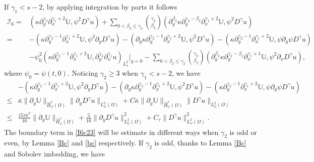 \documentclass{amsart}
\numberwithin{equation}{section}
\begin{document}
If $\gamma_{1}<s-2$, by applying integration by parts it follows
\begin{align}\label{I6c23}
\mathcal{I}_{6}
=&(\kappa\partial_{y}^{\gamma_{2}}\partial_{x}^{\gamma_{1}+2}\mathbb{U}, \psi^{2}D^{\gamma}u)
  +\sum_{0<\beta_{2}\leq\gamma_{2}}\binom{\gamma_{2}}{\beta_{2}}
   (\partial_{y}^{\beta_{2}}\kappa\partial_{y}^{\gamma_{2}-\beta_{2}}\partial_{x}^{\gamma_{1}+2}\mathbb{U},\psi^{2}D^{\gamma}u)\\
=&-(\kappa\partial_{y}^{\gamma_{2}-1}\partial_{x}^{\gamma_{1}+2}\mathbb{U}, \psi^{2} \partial_{y}D^{\gamma}u)
  -(\partial_{y}\kappa\partial_{y}^{\gamma_{2}-1}\partial_{x}^{\gamma_{1}+2}\mathbb{U}, \psi^{2}D^{\gamma}u)
  -(\kappa\partial_{y}^{\gamma_{2}-1}\partial_{x}^{\gamma_{1}+2}\mathbb{U}, \psi\partial_{y}\psi D^{\gamma}u)\nonumber\\
 &-\psi_{0}^{2}(\kappa\partial_{y}^{\gamma_{2}-1}\partial_{x}^{\gamma_{1}+2}\mathbb{U},\partial_{y}^{\gamma_{2}}\partial_{x}^{\gamma_{1}}u)_{L_{x}^{2}}|_{y=0}
  -\sum_{0<\beta_{2}\leq\gamma_{2}}\binom{\gamma_{2}}{\beta_{2}}
   (\partial_{y}^{\beta_{2}}\kappa\partial_{y}^{\gamma_{2}-\beta_{2}}\partial_{x}^{\gamma_{1}+1}\mathbb{U},\psi^{2}\partial_{x}D^{\gamma}u),\nonumber
\end{align}
where $\psi_{0}=\psi(t,0)$. Noticing $\gamma_{2}\geq3$ when $\gamma_{1}<s-2$, we have
\begin{align}\label{I6c231}
&-(\kappa\partial_{y}^{\gamma_{2}-1}\partial_{x}^{\gamma_{1}+2}\mathbb{U}, \psi^{2} \partial_{y}D^{\gamma}u)
 -(\partial_{y}\kappa\partial_{y}^{\gamma_{2}-1}\partial_{x}^{\gamma_{1}+2}\mathbb{U}, \psi^{2}D^{\gamma}u)
 -(\kappa\partial_{y}^{\gamma_{2}-1}\partial_{x}^{\gamma_{1}+2}\mathbb{U}, \psi\partial_{y}\psi D^{\gamma}u)\\
\leq& \bar{\kappa}\|\partial_{y}\mathbb{U}\|_{\hat{H}_{\psi}^{s}(\Omega)}\|\partial_{y}D^{\gamma}u\|_{L_{\psi}^{2}(\Omega)}
     +C\bar{\kappa}\|\partial_{y}\mathbb{U}\|_{\hat{H}_{\psi}^{s}(\Omega)}\|D^{\gamma}u\|_{L_{\psi}^{2}(\Omega)}\nonumber\\
\leq&  \frac{15\tau\bar{\kappa}^{2}}{16}\|\partial_{y}\mathbb{U}\|_{\hat{H}_{\psi}^{s}(\Omega)}
     +\frac{5}{16}\|\partial_{y}D^{\gamma}u\|_{L_{\psi}^{2}(\Omega)}^{2}
     +C_{\tau}\|D^{\gamma}u\|_{L_{\psi}^{2}(\Omega)}^{2}.\nonumber
\end{align}
The boundary term in \eqref{I6c23} will be estimate in different ways when $\gamma_{2}$ is odd or even, by Lemma \ref{Bc} and \ref{bc} respectively. If $\gamma_{2}$ is odd, thanks to Lemma \ref{Bc} and Sobolev imbedding, we have
\end{document}
